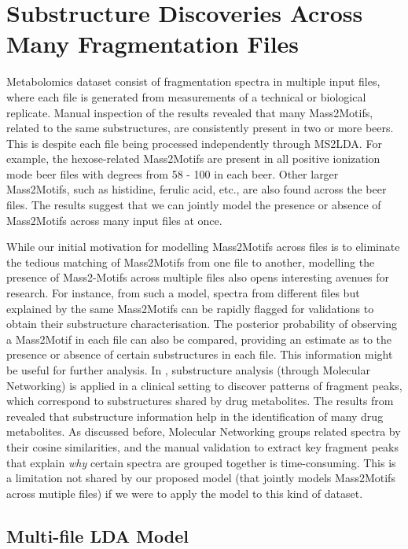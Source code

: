 \section{Substructure Discoveries Across Many Fragmentation Files}

Metabolomics dataset consist of fragmentation spectra in multiple input files, where each file is generated from measurements of a technical or biological replicate. Manual inspection of the results revealed that many Mass2Motifs, related to the same substructures, are consistently present in two or more beers. This is despite each file being processed independently through MS2LDA. For example, the hexose-related Mass2Motifs are present in all positive ionization mode beer files with degrees from 58 - 100 in each beer. Other larger Mass2Motifs, such as histidine, ferulic acid, etc., are also found across the beer files. The results suggest that we can jointly model the presence or absence of Mass2Motifs across many input files at once. 

While our initial motivation for modelling Mass2Motifs across files is to eliminate the tedious matching of Mass2Motifs from one file to another, modelling the presence of Mass2-Motifs across multiple files also opens interesting avenues for research. For instance, from such a model, spectra from different files but explained by the same Mass2Motifs can be rapidly flagged for validations to obtain their substructure characterisation. The posterior probability of observing a Mass2Motif in each file can also be compared, providing an estimate as to the presence or absence of certain substructures in each file. This information might be useful for further analysis. In \cite{van2016urinary}, substructure analysis (through Molecular Networking) is applied in a clinical setting to discover patterns of fragment peaks, which correspond to substructures shared by drug metabolites. The results from \cite{van2016urinary} revealed that substructure information help in the identification of many drug metabolites. As discussed before, Molecular Networking groups related spectra by their cosine similarities, and the manual validation to extract key fragment peaks that explain \emph{why} certain spectra are grouped together is time-consuming. This is a limitation not shared by our proposed model (that jointly models Mass2Motifs across mutiple files) if we were to apply the model to this kind of dataset.

\subsection{Multi-file LDA Model}

